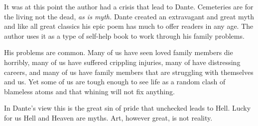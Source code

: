 It was at this point the author had a crisis that lead to Dante.
Cemeteries are for the living not the dead, \emph{as is myth.} Dante
created an extravagant and great myth and like all great classics his
epic poem has much to offer readers in any age. The author uses it as a
type of self-help book to work through his family problems.

His problems are common. Many of us have seen loved family members die
horribly, many of us have suffered crippling injuries, many of have
distressing careers, and many of us have family members that are
struggling with themselves and us. Yet some of us are tough enough to
see life as a random clash of blameless atoms and that whining will not
fix anything.

In Dante's view this is the great sin of pride that unchecked leads to
Hell. Lucky for us Hell and Heaven are myths. Art, however great, is not
reality.




%